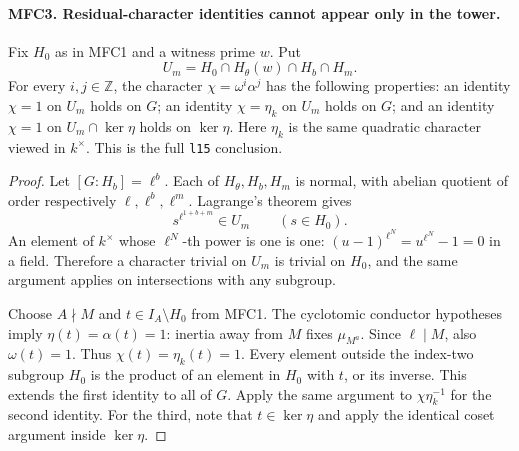 \paragraph{MFC3. Residual-character identities cannot appear only in the tower.}
\label{claim:MFC3}
Fix \(H_0\) as in MFC1 and a witness prime \(w\).  Put
\[
 U_m=H_0\cap H_\theta(w)\cap H_b\cap H_m.                 \tag{MFC.10}
\]
For every \(i,j\in\mathbb Z\), the character
\(\chi=\omega^i\alpha^j\) has the following properties:
an identity \(\chi=1\) on \(U_m\) holds on \(G\);
an identity \(\chi=\eta_k\) on \(U_m\) holds on \(G\);
and an identity \(\chi=1\) on \(U_m\cap\ker\eta\) holds
on \(\ker\eta\).  Here \(\eta_k\) is the same quadratic
character viewed in \(k^\times\).  This is the full
\texttt{l15} conclusion.

\begin{proof}
Let \([G:H_b]=\ell^b\).  Each of \(H_\theta,H_b,H_m\)
is normal, with abelian quotient of order respectively
\(\ell,\ell^b,\ell^m\).  Lagrange's theorem gives
\[
 s^{\ell^{1+b+m}}\in U_m\qquad(s\in H_0).                 \tag{MFC.11}
\]
An element of \(k^\times\) whose \(\ell^N\)-th power is one
is one: \((u-1)^{\ell^N}=u^{\ell^N}-1=0\) in a field.
Therefore a character trivial on \(U_m\) is trivial on
\(H_0\), and the same argument applies on intersections with
any subgroup.

Choose \(A\nmid M\) and \(t\in I_A\setminus H_0\) from
MFC1.  The cyclotomic conductor hypotheses imply
\(\eta(t)=\alpha(t)=1\): inertia away from \(M\) fixes
\(\mu_{M^a}\).  Since \(\ell\mid M\), also
\(\omega(t)=1\).  Thus \(\chi(t)=\eta_k(t)=1\).
Every element outside the index-two subgroup \(H_0\) is the
product of an element in \(H_0\) with \(t\), or its inverse.
This extends the first identity to all of \(G\).  Apply the
same argument to \(\chi\eta_k^{-1}\) for the second identity.
For the third, note that \(t\in\ker\eta\) and apply the
identical coset argument inside \(\ker\eta\).
\end{proof}

